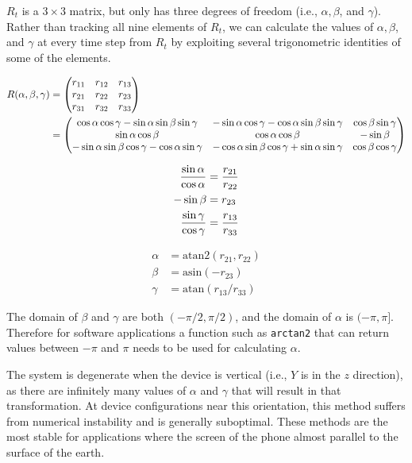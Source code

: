 \documentclass[10pt]{article}
\begin{document}
$R_t$ is a $3 \times 3$ matrix, but only has three degrees of freedom (i.e., $\alpha, \beta$, and $\gamma$). Rather than tracking all nine elements of $R_t$, we can calculate the values of $\alpha, \beta$, and $\gamma$ at every time step from $R_t$ by exploiting several trigonometric identities of some of the elements.

\begin{align}
   R(\alpha, \beta, \gamma) 
  &=
  \begin{pmatrix}
    r_{11} & r_{12} & r_{13} \\
    r_{21} & r_{22} & r_{23} \\
    r_{31} & r_{32} & r_{33}\\
  \end{pmatrix}
  \\&= 
  \begin{pmatrix}
  \cos{\alpha}\cos\gamma-\sin\alpha\sin\beta\sin\gamma & -\sin\alpha\cos\gamma - \cos{\alpha}\sin\beta\sin\gamma & \cos\beta\sin\gamma \\ 
  \sin\alpha\cos\beta & \cos{\alpha}\cos\beta & -\sin\beta \\
  -\sin\alpha\sin\beta\cos\gamma - \cos{\alpha}\sin\gamma & -\cos{\alpha}\sin\beta\cos\gamma + \sin\alpha\sin\gamma & \cos\beta\cos\gamma
  \end{pmatrix}
  \end{align}

\begin{align}
\frac{\sin\alpha}{\cos{\alpha}} &= \frac{r_{21}}{r_{22}} \\
-\sin\beta &= r_{23} \\
\frac{\sin\gamma}{\cos\gamma} &= \frac{r_{13}}{r_{33}}
\end{align}

\begin{align}
  \alpha &= \mathrm{atan2}(r_{21}, r_{22})\\
  \beta &= \mathrm{asin}(-r_{23}) \\ 
  \gamma &= \mathrm{atan}(r_{13}/r_{33})
\end{align}

The domain of $\beta$ and $\gamma$ are both $(-\pi/2, \pi/2)$, and the domain of $\alpha$ is $(-\pi, \pi]$. Therefore for software applications a function such as \texttt{arctan2} that can return values between $-\pi$ and $\pi$ needs to be used for calculating $\alpha$.

The system is degenerate when the device is vertical (i.e., $Y$ is in the $z$ direction), as there are infinitely many values of $\alpha$ and $\gamma$ that will result in that transformation. At device configurations near this orientation, this method suffers from numerical instability and is generally suboptimal. These methods are the most stable for applications where the screen of the phone almost parallel to the surface of the earth.
\end{document}
